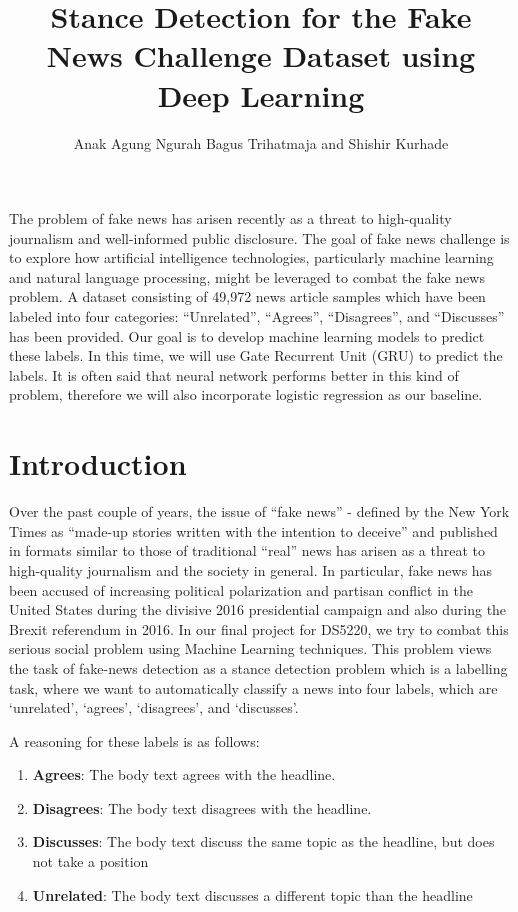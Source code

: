 \documentclass[12pt]{article}
\title{Stance Detection for the Fake News Challenge Dataset using Deep Learning}
\author{Anak Agung Ngurah Bagus Trihatmaja and Shishir Kurhade}
\date{}
\begin{document}
\maketitle

\abstract
The problem of fake news has arisen recently as a threat to high-quality 
journalism and well-informed public disclosure. 
The goal of fake news challenge is to explore how artificial intelligence 
technologies, particularly machine learning and 
natural language processing, might be leveraged to combat the fake news problem.
A dataset consisting of 49,972 news article samples which have been labeled 
into four categories: 
“Unrelated”, “Agrees”, “Disagrees”, and “Discusses” has been provided.
Our goal is to develop machine learning models to predict these labels. 
In this time, we will use Gate Recurrent Unit (GRU) to predict the labels.
It is often said that neural network performs better in this kind of problem,
therefore we will also incorporate logistic regression as our baseline.


\section{Introduction}
Over the past couple of years, the issue of “fake news” \-- defined by the 
New York Times as “made-up stories written with the intention to deceive” and 
published in formats similar to those of traditional “real” news has arisen as 
a threat to high-quality journalism and the society in general. 
In particular, fake news has been accused of increasing political polarization 
and partisan conflict in the United States during the divisive 2016 
presidential campaign and also during the Brexit referendum in 2016.
In our final project for DS5220, we try to combat this serious social problem 
using Machine Learning techniques. This problem views the task of fake-news 
detection as a stance detection problem which is a labelling task, 
where we want to automatically classify a news into four labels, 
which are ‘unrelated’, ‘agrees’, ‘disagrees’, and ‘discusses’.  

A reasoning for these labels is as follows:
\begin{enumerate}
  \item \textbf{Agrees}: The body text agrees with the headline.
  \item \textbf{Disagrees}: The body text disagrees with the headline.
  \item \textbf{Discusses}: The body text discuss the same topic as the headline, 
    but does not take a position
  \item \textbf{Unrelated}: The body text discusses a different topic than the headline
\end{enumerate}
\end{document}
